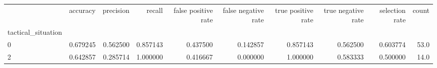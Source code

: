 \begin{tabular}{lrrrrrrrrr}
\toprule
{} &  accuracy &  precision &    recall &  false positive rate &  false negative rate &  true positive rate &  true negative rate &  selection rate &  count \\
tactical\_situation &           &            &           &                      &                      &                     &                     &                 &        \\
\midrule
0                  &  0.679245 &   0.562500 &  0.857143 &             0.437500 &             0.142857 &            0.857143 &            0.562500 &        0.603774 &   53.0 \\
2                  &  0.642857 &   0.285714 &  1.000000 &             0.416667 &             0.000000 &            1.000000 &            0.583333 &        0.500000 &   14.0 \\
\bottomrule
\end{tabular}

